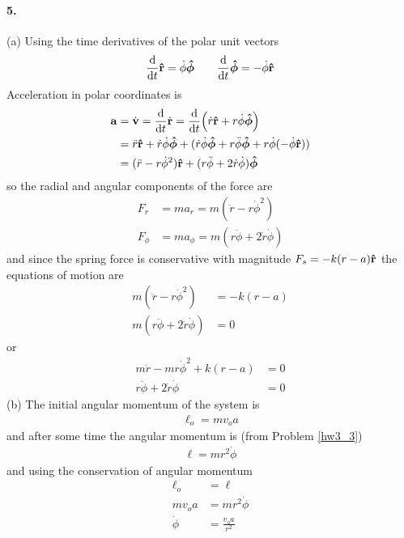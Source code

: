 \documentclass[../hw.tex]{subfiles}
\begin{document}
\paragraph*{5.} (a) Using the time derivatives of the polar unit vectors
\begin{align*}
  \dv{t} \vu{r} = \dot\phi \vu*{\phi} \qquad \dv{t} \vu*{\phi} = -\dot\phi \vu{r}
\end{align*}
Acceleration in polar coordinates is
\begin{align*}
  \vb{a} &= \dot{\vb{v}} = \dv{t} \dot{\vb{r}} = \dv{t} (\dot r \vu{r} + r \dot\phi \vu*{\phi}) \\
  &= \ddot r \vu r + \dot r \dot\phi \vu*\phi 
    + (\dot r \dot\phi  \vu*\phi + r \ddot \phi \vu*\phi  + r \dot\phi (-\dot\phi \vu r)) \\
  &= (\ddot r - r \dot\phi^2) \vu{r} + (r \ddot\phi + 2 \dot r \dot\phi) \vu*{\phi}
\end{align*}
so the radial and angular components of the force are 
\begin{align*}
  F_r &= m a_r = m (\ddot r - r \dot\phi^2) \\
  F_\phi &= m a_\phi = m (r \ddot\phi + 2 \dot r \dot\phi)
\end{align*}
and since the spring force is conservative with magnitude $F_s = -k(r - a) \vu{r}$ the equations of
motion are
\begin{align*}
  m(\ddot r - r \dot\phi^2) &= -k(r - a) \\
  m(r \ddot\phi + 2 \dot r \dot\phi) &= 0
\end{align*}
or
\begin{align*}
  m \ddot r - m r \dot\phi^2 + k(r - a) &= 0 \\
  r \ddot\phi + 2 \dot r \dot\phi &= 0
\end{align*}
(b) The initial angular momentum of the system is
\begin{align*}
  \ell_o = m v_o a
\end{align*}
and after some time the angular momentum is (from Problem \autoref{hw3_3})
\begin{align*}
  \ell = m r^2 \dot\phi
\end{align*}
and using the conservation of angular momentum
\begin{align*}
  \ell_o &= \ell \\
  m v_o a &= m r^2 \dot\phi \\
  \dot\phi &= \frac{v_o a}{r^2}
\end{align*}
\end{document}
